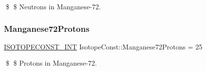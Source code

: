 \$ \$ Neutrons in Manganese-\/72. \mbox{\label{group___isotope_const-_manganese-_mn72_ga1c800ec88b596ddff64d82cc15496730}} 
\subsubsection{\texorpdfstring{Manganese72\+Protons}{Manganese72Protons}}
{\footnotesize\ttfamily \mbox{\hyperlink{group___isotope_const-_macros_ga5f18360b3e99483a35c32d789e62621c}{I\+S\+O\+T\+O\+P\+E\+C\+O\+N\+S\+T\+\_\+\+I\+NT}} Isotope\+Const\+::\+Manganese72\+Protons = 25}

\$ \$ Protons in Manganese-\/72. 